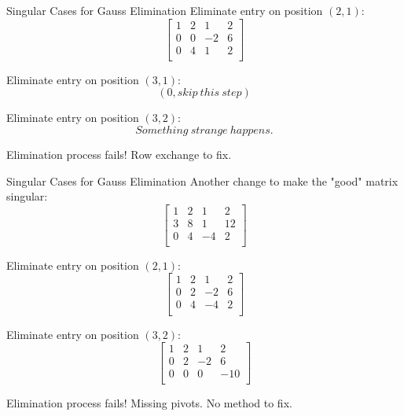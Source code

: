 \documentclass{beamer}
\begin{document}
\begin{frame}{Singular Cases for Gauss Elimination}
Eliminate entry on position $(2,1)$:
\begin{equation*}
    \left[ \begin{matrix}
        1&		2&		1&		2\\
        0&		0&		-2&		6\\
        0&		4&		1&		2\\
    \end{matrix} \right]
\end{equation*}

Eliminate entry on position $(3,1)$:
\begin{equation*}
    (0, skip \: this \: step)
\end{equation*}

Eliminate entry on position $(3,2)$:
\begin{equation*}
    Something \: strange \: happens.
\end{equation*}

Elimination process fails! Row exchange to fix.

\end{frame}

\begin{frame}{Singular Cases for Gauss Elimination}
Another change to make the "good" matrix singular:
\begin{equation*}
    \left[ \begin{matrix}
        1&		2&		1&		2\\
        3&		8&		1&		12\\
        0&		4&		-4&		2\\
    \end{matrix} \right]
\end{equation*}

Eliminate entry on position $(2,1)$:
\begin{equation*}
    \left[ \begin{matrix}
        1&		2&		1&		2\\
        0&		2&		-2&		6\\
        0&		4&		-4&		2\\
    \end{matrix} \right]
\end{equation*}

Eliminate entry on position $(3,2)$:
\begin{equation*}
    \left[ \begin{matrix}
        1&		2&		1&		2\\
        0&		2&		-2&		6\\
        0&		0&		0&		-10\\
    \end{matrix} \right]
\end{equation*}

Elimination process fails! Missing pivots. No method to fix.

\end{frame}
\end{document}
